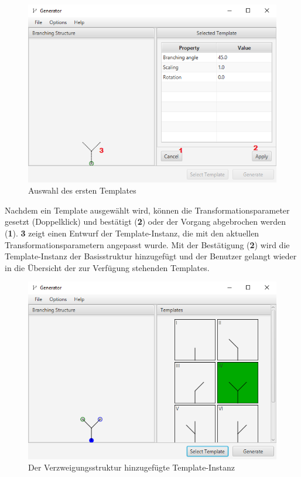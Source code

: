 \begin{figure}[H]
    \centering
    \includegraphics[width=12cm]{../images/UI_template.png}
    \caption{Auswahl des ersten Templates}
\end{figure}

Nachdem ein Template ausgewählt wird, können die Transformationsparameter gesetzt (Doppelklick) und bestätigt (\textbf{2})
oder der Vorgang abgebrochen werden (\textbf{1}).
\textbf{3} zeigt einen Entwurf der Template-Instanz, die mit den aktuellen Transformationsparametern angepasst wurde.
Mit der Bestätigung (\textbf{2}) wird die Template-Instanz der Basisstruktur hinzugefügt und der Benutzer gelangt wieder
in die Übersicht der zur Verfügung stehenden Templates.
\begin{figure}[H]
    \centering
    \includegraphics[width=12cm]{../images/UI_applied.png}
    \caption{Der Verzweigungsstruktur hinzugefügte Template-Instanz}
\end{figure}

